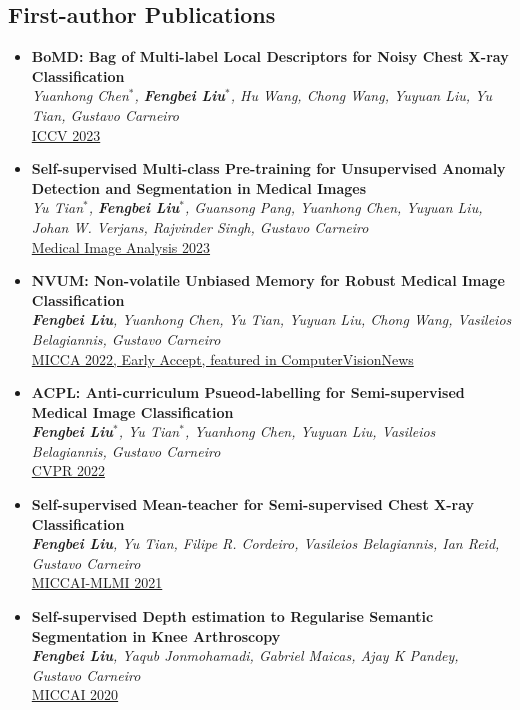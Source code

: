 \documentclass[letterpaper,11pt]{article}
\newcommand{\resumePubheading}[3]{
  \vspace{-2pt} \item\small{
    {\textbf{#1} \vspace{-2pt}}\\
    {\textit{\small#2}}\\ 
    \underline{\small#3}
  }
}
\newcommand{\resumeSubHeadingListStart}{\begin{itemize}[leftmargin=0.15in, label={}]}
\newcommand{\resumeSubHeadingListEnd}{\end{itemize}}
\begin{document}
  \subsection*{First-author Publications}
  \resumeSubHeadingListStart
    \resumePubheading{BoMD: Bag of Multi-label Local Descriptors for Noisy Chest X-ray Classification}{Yuanhong Chen$^*$, \textbf{Fengbei Liu}$^*$, Hu Wang, Chong Wang, Yuyuan Liu, Yu Tian, Gustavo Carneiro}{ICCV 2023}
    \resumePubheading{Self-supervised Multi-class Pre-training for Unsupervised Anomaly Detection and Segmentation in Medical Images}{Yu Tian$^*$, \textbf{Fengbei Liu}$^*$, Guansong Pang, Yuanhong Chen, Yuyuan Liu, Johan W. Verjans, Rajvinder Singh, Gustavo Carneiro}{Medical Image Analysis 2023}
    \resumePubheading{NVUM: Non-volatile Unbiased Memory for Robust Medical Image Classification}{\textbf{Fengbei Liu}, Yuanhong Chen, Yu Tian, Yuyuan Liu, Chong Wang, Vasileios Belagiannis, Gustavo Carneiro}{MICCA 2022, Early Accept, featured in ComputerVisionNews}
    \resumePubheading{ACPL: Anti-curriculum Psueod-labelling for Semi-supervised Medical Image Classification}{\textbf{Fengbei Liu}$^*$, Yu Tian$^*$, Yuanhong Chen, Yuyuan Liu, Vasileios Belagiannis, Gustavo Carneiro}{CVPR 2022}
    \resumePubheading{Self-supervised Mean-teacher for Semi-supervised Chest X-ray Classification}{\textbf{Fengbei Liu}, Yu Tian, Filipe R. Cordeiro, Vasileios Belagiannis, Ian Reid, Gustavo Carneiro}{MICCAI-MLMI 2021}
    \resumePubheading{Self-supervised Depth estimation to Regularise Semantic Segmentation in Knee Arthroscopy}{\textbf{Fengbei Liu}, Yaqub Jonmohamadi, Gabriel Maicas, Ajay K Pandey, Gustavo Carneiro}{MICCAI 2020}
  \resumeSubHeadingListEnd
\end{document}
